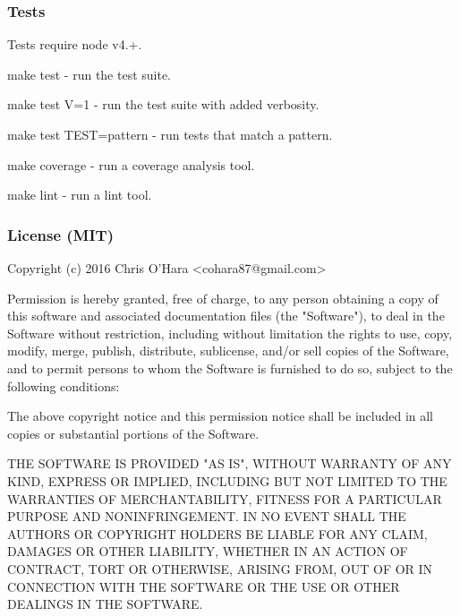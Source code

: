 \subsubsection*{Tests}

Tests require node v4.+.


\begin{DoxyItemize}
\item {\ttfamily make test} -\/ run the test suite.
\item {\ttfamily make test V=1} -\/ run the test suite with added verbosity.
\item {\ttfamily make test T\+E\+ST=pattern} -\/ run tests that match a pattern.
\item {\ttfamily make coverage} -\/ run a coverage analysis tool.
\item {\ttfamily make lint} -\/ run a lint tool.
\end{DoxyItemize}

\subsubsection*{License (M\+IT)}


\begin{DoxyCode}
Copyright (c) 2016 Chris O'Hara <cohara87@gmail.com>

Permission is hereby granted, free of charge, to any person obtaining
a copy of this software and associated documentation files (the
"Software"), to deal in the Software without restriction, including
without limitation the rights to use, copy, modify, merge, publish,
distribute, sublicense, and/or sell copies of the Software, and to
permit persons to whom the Software is furnished to do so, subject to
the following conditions:

The above copyright notice and this permission notice shall be
included in all copies or substantial portions of the Software.

THE SOFTWARE IS PROVIDED "AS IS", WITHOUT WARRANTY OF ANY KIND,
EXPRESS OR IMPLIED, INCLUDING BUT NOT LIMITED TO THE WARRANTIES OF
MERCHANTABILITY, FITNESS FOR A PARTICULAR PURPOSE AND
NONINFRINGEMENT. IN NO EVENT SHALL THE AUTHORS OR COPYRIGHT HOLDERS BE
LIABLE FOR ANY CLAIM, DAMAGES OR OTHER LIABILITY, WHETHER IN AN ACTION
OF CONTRACT, TORT OR OTHERWISE, ARISING FROM, OUT OF OR IN CONNECTION
WITH THE SOFTWARE OR THE USE OR OTHER DEALINGS IN THE SOFTWARE.
\end{DoxyCode}
 